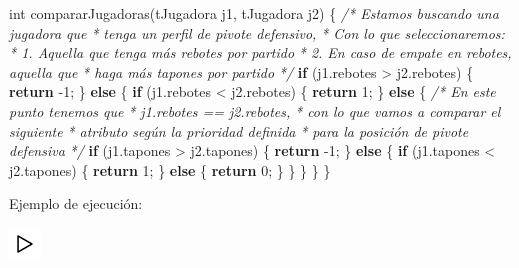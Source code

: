 \documentclass[
]{book}
\newenvironment{Shaded}{\begin{snugshade}}{\end{snugshade}}
\newcommand{\CommentTok}[1]{\textcolor[rgb]{0.56,0.35,0.01}{\textit{#1}}}
\newcommand{\ControlFlowTok}[1]{\textcolor[rgb]{0.13,0.29,0.53}{\textbf{#1}}}
\newcommand{\DataTypeTok}[1]{\textcolor[rgb]{0.13,0.29,0.53}{#1}}
\newcommand{\DecValTok}[1]{\textcolor[rgb]{0.00,0.00,0.81}{#1}}
\newcommand{\NormalTok}[1]{#1}
\begin{document}
\begin{Shaded}
\begin{Highlighting}[]
\DataTypeTok{int}\NormalTok{ compararJugadoras(tJugadora j1, tJugadora j2) \{}
    \CommentTok{/* Estamos buscando una jugadora que}
\CommentTok{     * tenga un perfil de pivote defensivo,}
\CommentTok{     * Con lo que seleccionaremos:}
\CommentTok{     * 1. Aquella que tenga más rebotes por partido}
\CommentTok{     * 2. En caso de empate en rebotes, aquella que}
\CommentTok{     *    haga más tapones por partido}
\CommentTok{     */} 
    \ControlFlowTok{if}\NormalTok{ (j1.rebotes \textgreater{} j2.rebotes) \{}
        \ControlFlowTok{return}\NormalTok{ {-}}\DecValTok{1}\NormalTok{;}
\NormalTok{    \} }\ControlFlowTok{else}\NormalTok{ \{}
        \ControlFlowTok{if}\NormalTok{ (j1.rebotes \textless{} j2.rebotes) \{}
            \ControlFlowTok{return} \DecValTok{1}\NormalTok{;}
\NormalTok{        \} }\ControlFlowTok{else}\NormalTok{ \{}
            \CommentTok{/* En este punto tenemos que}
\CommentTok{             * j1.rebotes == j2.rebotes,}
\CommentTok{             * con lo que vamos a comparar el siguiente}
\CommentTok{             * atributo según la prioridad definida}
\CommentTok{             * para la posición de pivote defensiva}
\CommentTok{             */}
            \ControlFlowTok{if}\NormalTok{ (j1.tapones \textgreater{} j2.tapones) \{}
                \ControlFlowTok{return}\NormalTok{ {-}}\DecValTok{1}\NormalTok{;}
\NormalTok{            \} }\ControlFlowTok{else}\NormalTok{ \{}
                \ControlFlowTok{if}\NormalTok{ (j1.tapones \textless{} j2.tapones) \{}
                    \ControlFlowTok{return} \DecValTok{1}\NormalTok{;}
\NormalTok{                \} }\ControlFlowTok{else}\NormalTok{ \{}
                    \ControlFlowTok{return} \DecValTok{0}\NormalTok{;}
\NormalTok{                \}}
\NormalTok{            \}}
\NormalTok{        \}}
\NormalTok{    \}}
\NormalTok{\}}
\end{Highlighting}
\end{Shaded}

Ejemplo de ejecución:

\includegraphics{./img/play.png}
\end{document}
